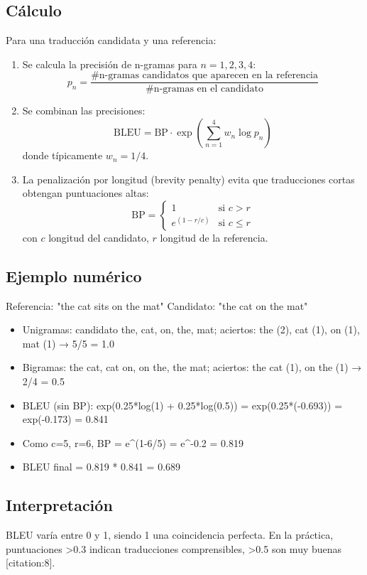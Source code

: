 \documentclass[12pt,a4paper,openany,oneside]{book}
\begin{document}
\subsection{Cálculo}
Para una traducción candidata y una referencia:
\begin{enumerate}
    \item Se calcula la precisión de n-gramas para \(n=1,2,3,4\):
    \[
    p_n = \frac{\text{\# n-gramas candidatos que aparecen en la referencia}}{\text{\# n-gramas en el candidato}}
    \]
    \item Se combinan las precisiones:
    \[
    \text{BLEU} = \text{BP} \cdot \exp\left( \sum_{n=1}^4 w_n \log p_n \right)
    \]
    donde típicamente \(w_n = 1/4\).
    \item La penalización por longitud (brevity penalty) evita que traducciones cortas obtengan puntuaciones altas:
    \[
    \text{BP} = \begin{cases}
    1 & \text{si } c > r \\
    e^{(1 - r/c)} & \text{si } c \le r
    \end{cases}
    \]
    con \(c\) longitud del candidato, \(r\) longitud de la referencia.
\end{enumerate}

\subsection{Ejemplo numérico}
Referencia: "the cat sits on the mat"
Candidato: "the cat on the mat"

\begin{itemize}
    \item Unigramas: candidato {the, cat, on, the, mat}; aciertos: the (2), cat (1), on (1), mat (1) → 5/5 = 1.0
    \item Bigramas: {the cat, cat on, on the, the mat}; aciertos: the cat (1), on the (1) → 2/4 = 0.5
    \item BLEU (sin BP): exp(0.25*log(1) + 0.25*log(0.5)) = exp(0.25*(-0.693)) = exp(-0.173) = 0.841
    \item Como c=5, r=6, BP = e^{(1-6/5)} = e^{-0.2} = 0.819
    \item BLEU final = 0.819 * 0.841 = 0.689
\end{itemize}

\subsection{Interpretación}
BLEU varía entre 0 y 1, siendo 1 una coincidencia perfecta. En la práctica, puntuaciones >0.3 indican traducciones comprensibles, >0.5 son muy buenas [citation:8].
\end{document}
